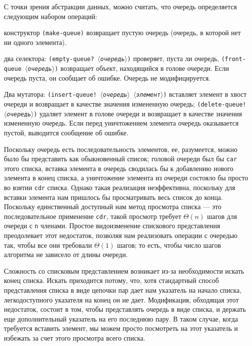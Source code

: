 С точки зрения абстракции данных, можно считать, что
очередь определяется следующим набором операций:
\pagebreak
\begin{plainlist}
\samepage
\item
конструктор {\tt (make-queue)} возвращает пустую очередь (очередь, в которой нет ни одного элемента).

\item
два селектора: {\tt (empty-queue? \textit{$\langle$очередь$\rangle$})} проверяет, пуста ли очередь, {\tt (front-queue \textit{$\langle$очередь$\rangle$})} возвращает объект, находящийся в голове очереди.  Если очередь пуста,
он сообщает об ошибке. Очередь не модифицируется.

\item
Два мутатора: {\tt (insert-queue! \textit{$\langle$очередь$\rangle$} \textit{$\langle$элемент$\rangle$})}
вставляет элемент в хвост очереди и возвращает в качестве значения
измененную очередь; {\tt (delete-queue! \textit{$\langle$очередь$\rangle$})}
удаляет элемент в голове очереди и возвращает в качестве значения
измененную очередь.  Если перед уничтожением элемента очередь
оказывается пустой, выводится сообщение об ошибке.
\end{plainlist}

Поскольку очередь есть последовательность элементов, ее,
разумеется, можно было бы представить как обыкновенный список;
головой очереди был бы {\tt car} этого списка, вставка
элемента в очередь сводилась бы к добавлению нового элемента в конец
списка, а уничтожение элемента из очереди состояло бы просто во взятии
{\tt cdr} списка.  Однако такая реализация неэффективна,
поскольку для вставки элемента нам пришлось бы просматривать весь
список до конца.   Поскольку единственный доступный нам метод
просмотра списка --- это последовательное применение {\tt cdr},
такой просмотр требует $\Theta (n)$ шагов для очереди с
{\tt n} членами.  Простое видоизменение спискового представления
преодолевает этот недостаток, позволяя нам реализовать операции с
очередью так, чтобы все они требовали $\Theta(1)$ шагов;
то есть, чтобы число шагов алгоритма не зависело от длины очереди.

Сложность со списковым представлением возникает из-за
необходимости искать конец списка.  Искать приходится потому, что,
хотя стандартный способ представления списка в виде цепочки
пар дает нам указатель на начало списка, легкодоступного указателя на
конец он не дает.  Модификация, обходящая этот недостаток, состоит в
том, чтобы представлять очередь в виде списка, и держать еще
дополнительный указатель на его последнюю пару.  В таком случае, когда
требуется вставить элемент, мы можем просто посмотреть на этот
указатель и избежать за счет этого просмотра всего списка.


